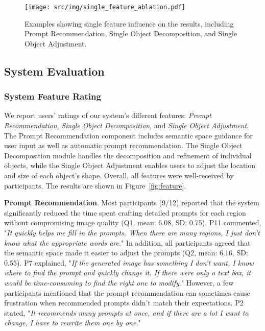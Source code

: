 \begin{figure*}[t]
    \centering
    \texttt{[image: src/img/single\_feature\_ablation.pdf]}
    \vspace{-2mm}
    \caption{Examples showing single feature influence on the results, including Prompt Recommendation, Single Object Decomposition, and Single Object Adjustment.}
    \label{fig:feature_ablation}
    \vspace{-1mm}
\end{figure*}

\subsection{System Evaluation}
\subsubsection{System Feature Rating}\label{ssec:featurerating}
We report users' ratings of our system's different features: \textit{Prompt Recommendation}, \textit{Single Object Decomposition}, and \textit{Single Object Adjustment}.
The Prompt Recommendation component includes semantic space guidance for user input as well as automatic prompt recommendation. The Single Object Decomposition module handles the decomposition and refinement of individual objects, while the Single Object Adjustment enables users to adjust the location and size of each object's shape.
Overall, all features were well-received by participants. 
The results are shown in Figure~\ref{fig:feature}.

\textbf{Prompt Recommendation}. Most participants (9/12) reported that the system significantly reduced the time spent crafting detailed prompts for each region without compromising image quality (Q1, mean: 6.08, SD: 0.75). 
P11 commented, "\emph{It quickly helps me fill in the prompts. When there are many regions, I just don’t know what the appropriate words are}."
In addition, all participants agreed that the semantic space made it easier to adjust the prompts (Q2, mean: 6.16, SD: 0.55). 
P7 explained, "\emph{If the generated image has something I don't want, I know where to find the prompt and quickly change it. If there were only a text box, it would be time-consuming to find the right one to modify}."
However, a few participants mentioned that the prompt recommendation can sometimes cause frustration when recommended prompts didn’t match their expectations. 
P2 stated, "\emph{It recommends many prompts at once, and if there are a lot I want to change, I have to rewrite them one by one}."

